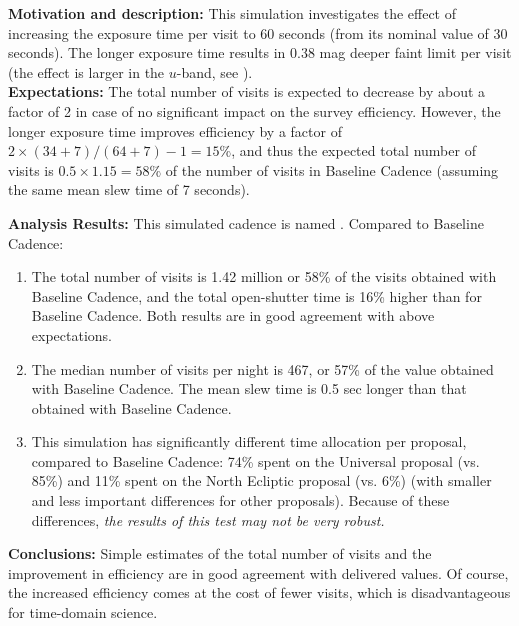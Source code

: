 
{\bf Motivation and description:} This simulation investigates the
effect of increasing the exposure time per visit to 60 seconds (from
its nominal value of 30 seconds). The longer exposure time results in
0.38 mag deeper faint limit per visit (the effect is larger in the
$u$-band, see ). \\

{\bf Expectations:} The total number of visits is expected to decrease by about
a factor of 2 in case of no significant impact on the survey efficiency.
However, the longer exposure time improves efficiency by a factor of
$2\times(34+7)/(64+7)-1=15\%$, and thus the expected total number of visits is
$0.5\times1.15 = 58\%$ of the number of visits in Baseline Cadence (assuming
the same mean slew time of 7 seconds).

{\bf Analysis Results:} This simulated cadence is named .
Compared to Baseline Cadence:
\begin{enumerate}
\item The total number of visits is 1.42 million or 58\% of the visits
obtained with Baseline Cadence, and the total open-shutter time is
16\% higher than for Baseline Cadence. Both results are in good
agreement with above expectations.
\item The median number of visits per night is 467, or 57\% of the
value obtained with Baseline Cadence. The mean slew time is 0.5 sec
longer than that obtained with Baseline Cadence.
\item This simulation has significantly different time allocation per
proposal, compared to Baseline Cadence: 74\% spent on the Universal
proposal (vs. 85\%) and 11\%  spent on the North Ecliptic proposal
(vs. 6\%)  (with smaller and less important differences for other
proposals). Because of these differences, {\it the results of this
test may not be very robust.}
\end{enumerate}

{\bf Conclusions:}
Simple estimates of the total number of visits and the improvement in
efficiency are in good agreement with delivered values. Of course, the
increased efficiency comes at the cost of fewer visits, which is
disadvantageous for time-domain science.




